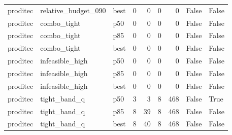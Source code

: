 \begin{tabular}{lllrrrrll}
proditec &  relative\_budget\_090 &   best &                   0 &                 0 &                    0 &                            0 &                                        False &                                False \\
proditec &          combo\_tight &    p50 &                   0 &                 0 &                    0 &                            0 &                                        False &                                False \\
proditec &          combo\_tight &    p85 &                   0 &                 0 &                    0 &                            0 &                                        False &                                False \\
proditec &          combo\_tight &   best &                   0 &                 0 &                    0 &                            0 &                                        False &                                False \\
proditec &      infeasible\_high &    p50 &                   0 &                 0 &                    0 &                            0 &                                        False &                                False \\
proditec &      infeasible\_high &    p85 &                   0 &                 0 &                    0 &                            0 &                                        False &                                False \\
proditec &      infeasible\_high &   best &                   0 &                 0 &                    0 &                            0 &                                        False &                                False \\
proditec &         tight\_band\_q &    p50 &                   3 &                 3 &                    8 &                          468 &                                        False &                                 True \\
proditec &         tight\_band\_q &    p85 &                   8 &                39 &                    8 &                          468 &                                        False &                                False \\
proditec &         tight\_band\_q &   best &                   8 &                40 &                    8 &                          468 &                                        False &                                False \\

\end{tabular}
